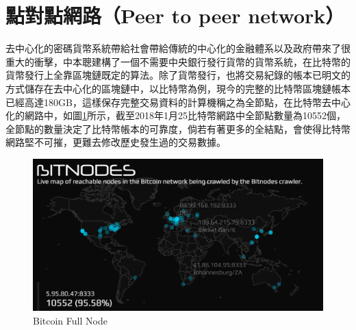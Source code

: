 	\section{點對點網路（Peer to peer network）}

	去中心化的密碼貨幣系統帶給社會帶給傳統的中心化的金融體系以及政府帶來了很重大的衝擊，中本聰建構了一個不需要中央銀行發行貨幣的貨幣系統，在比特幣的貨幣發行上全靠區塊鏈既定的算法。除了貨幣發行，也將交易紀錄的帳本已明文的方式儲存在去中心化的區塊鏈中，以比特幣為例，現今的完整的比特幣區塊鏈帳本已經高達180GB，這樣保存完整交易資料的計算機稱之為全節點，在比特幣去中心化的網路中，如圖\ref{bitcoinfullnode}所示，截至2018年1月25比特幣網路中全節點數量為10552個\supercite{bitcoinfullnode}，全節點的數量決定了比特幣帳本的可靠度，倘若有著更多的全結點，會使得比特幣網路堅不可摧，更難去修改歷史發生過的交易數據。

	\begin{figure}
		\centering
		\includegraphics[width = .9\textwidth]{bitcoinfullnode.png}
		\caption{Bitcoin Full Node\supercite{bitcoinfullnode}}\label{bitcoinfullnode}
	\end{figure}






